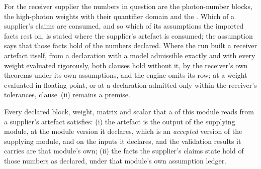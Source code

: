 
For the receiver supplier the numbers in question are the photon-number
blocks, the high-photon weights with their quantifier domain and the
. Which of a
supplier's claims are consumed, and so which of its assumptions the imported
facts rest on, is stated where the supplier's artefact is consumed; the
assumption says that those facts hold of the numbers declared. Where the run
built a receiver artefact itself, from a declaration with a model admissible
exactly and with every weight evaluated rigorously, both clauses hold
without it, by the receiver's own theorems under its own assumptions, and
the engine omits its row; at a weight evaluated in floating point, or at a
declaration admitted only within the receiver's tolerances, clause~(ii)
remains a premise.

\begin{assumption}\label{ass:recv}
Every declared block, weight, matrix and scalar that a
 of this module reads from a supplier's artefact
satisfies:
(i) the artefact is the output of the supplying module, at the module version
it declares, which is an \emph{accepted} version of the supplying module, and
on the inputs it declares, and the validation results it carries are that
module's own;
(ii) the facts the supplier's claims state hold of those numbers as declared,
under that module's own assumption ledger.
\end{assumption}
